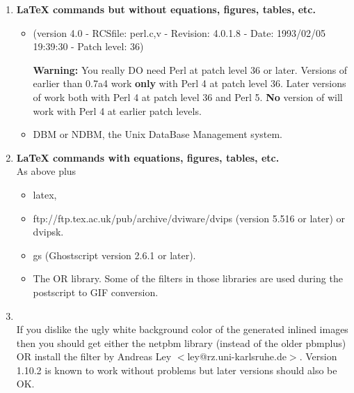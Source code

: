 \begin{enumerate}
\item {\bf LaTeX commands but without equations, figures, tables, etc.} \hfill
\begin{itemize}
\item {} 
(version 4.0 - RCSfile: perl.c,v - Revision: 4.0.1.8 - Date:
1993/02/05 19:39:30 - Patch level: 36)

{\bf Warning:} You really DO need Perl at patch level 36 or later.
Versions of \latextohtml earlier than 0.7a4 work {\bf only} with 
Perl 4 at patch level 36. Later versions of \latextohtml work 
both with Perl 4 at patch level 36 and Perl 5. {\bf No} version 
of \latextohtml will work  with Perl 4 at earlier patch levels.

\item {\fn DBM} or {\fn NDBM}, the Unix DataBase Management system.
\end{itemize}

\item {\bf LaTeX commands with equations, figures, tables, etc.} \\
As above plus
\begin{itemize}
\item {\fn latex},
\item  {}
{ftp://ftp.tex.ac.uk/pub/archive/dviware/dvips}
(version  5.516 or later) or {\fn dvipsk}.
\item {\fn gs} (Ghostscript version 2.6.1 or later). 
\item The 
OR 
library.
Some of the filters in those libraries are used during the postscript to
GIF conversion. 
\end{itemize}

\item 
{\bf {}}\\
If you dislike the ugly white background color of the
generated inlined images then you should get either 
the {\fn netpbm} library (instead of the older {\fn pbmplus}) OR
install the
filter by Andreas Ley $<$ley@rz.uni-karlsruhe.de$>$. 
Version 1.10.2 is
known to work without problems but later versions should also be OK.

\end{enumerate} 

